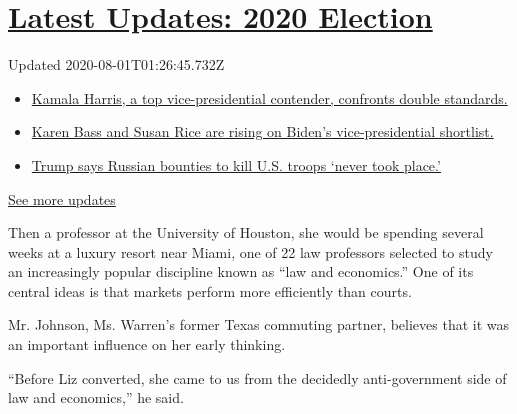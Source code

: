 \hypertarget{latest-updates-2020-election}{%
\section{\texorpdfstring{\href{https://www.nytimes.com/2020/07/31/us/elections/biden-vs-trump.html?action=click\&pgtype=Article\&state=default\&region=MAIN_CONTENT_1\&context=storylines_live_updates}{Latest
Updates: 2020
Election}}{Latest Updates: 2020 Election}}\label{latest-updates-2020-election}}

Updated 2020-08-01T01:26:45.732Z

\begin{itemize}
\tightlist
\item
  \href{https://www.nytimes.com/2020/07/31/us/elections/biden-vs-trump.html?action=click\&pgtype=Article\&state=default\&region=MAIN_CONTENT_1\&context=storylines_live_updates\#link-29fdff45}{Kamala
  Harris, a top vice-presidential contender, confronts double
  standards.}
\item
  \href{https://www.nytimes.com/2020/07/31/us/elections/biden-vs-trump.html?action=click\&pgtype=Article\&state=default\&region=MAIN_CONTENT_1\&context=storylines_live_updates\#link-13ec3d9c}{Karen
  Bass and Susan Rice are rising on Biden's vice-presidential
  shortlist.}
\item
  \href{https://www.nytimes.com/2020/07/31/us/elections/biden-vs-trump.html?action=click\&pgtype=Article\&state=default\&region=MAIN_CONTENT_1\&context=storylines_live_updates\#link-49e9a016}{Trump
  says Russian bounties to kill U.S. troops `never took place.'}
\end{itemize}

\href{https://www.nytimes.com/2020/07/31/us/elections/biden-vs-trump.html?action=click\&pgtype=Article\&state=default\&region=MAIN_CONTENT_1\&context=storylines_live_updates}{See
more updates}

Then a professor at the University of Houston, she would be spending
several weeks at a luxury resort near Miami, one of 22 law professors
selected to study an increasingly popular discipline known as ``law and
economics.'' One of its central ideas is that markets perform more
efficiently than courts.

Mr. Johnson, Ms. Warren's former Texas commuting partner, believes that
it was an important influence on her early thinking.

``Before Liz converted, she came to us from the decidedly
anti-government side of law and economics,'' he said.

